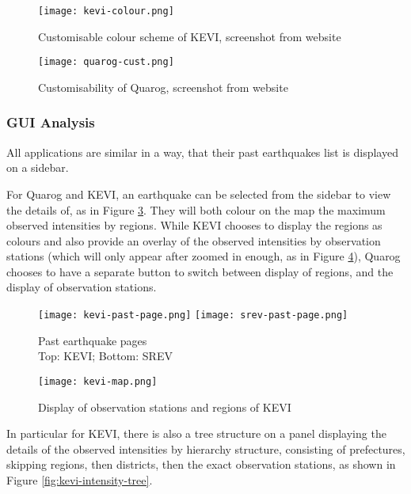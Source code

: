 \begin{figure}[htp]
    \centering

    \texttt{[image: kevi-colour.png]}
    \caption[Customisable colour scheme of KEVI]{Customisable colour scheme of KEVI, screenshot from website}
    \label{fig:kevi-colour-cust}
\end{figure}

\begin{figure}[htp]
    \centering

    \texttt{[image: quarog-cust.png]}
    \caption[Customisability of Quarog]{Customisability of Quarog, screenshot from website}
    \label{fig:quarog-cust}
\end{figure}

\subsubsection{GUI Analysis}

All applications are similar in a way, that their past earthquakes list is displayed on a sidebar.

For Quarog and KEVI, an earthquake can be selected from the sidebar to view the details of, as in Figure \ref{fig:kevi-srev-past-page}. They will both colour on the map the maximum observed intensities by regions. While KEVI chooses to display the regions as colours and also provide an overlay of the observed intensities by observation stations (which will only appear after zoomed in enough, as in Figure \ref{fig:kevi-map}), Quarog chooses to have a separate button to switch between display of regions, and the display of observation stations.

\begin{figure}[htp]
    \centering

    \texttt{[image: kevi-past-page.png]}
    \texttt{[image: srev-past-page.png]}
    \caption[Past earthquake pages for KEVI and SREV]{Past earthquake pages\\
        Top: KEVI; Bottom: SREV}
    \label{fig:kevi-srev-past-page}
\end{figure}
\begin{figure}[htp]
    \centering

    \texttt{[image: kevi-map.png]}
    \caption{Display of observation stations and regions of KEVI}
    \label{fig:kevi-map}
\end{figure}

In particular for KEVI, there is also a tree structure on a panel displaying the details of the observed intensities by hierarchy structure, consisting of prefectures, skipping regions, then districts, then the exact observation stations, as shown in Figure \ref{fig:kevi-intensity-tree}.

